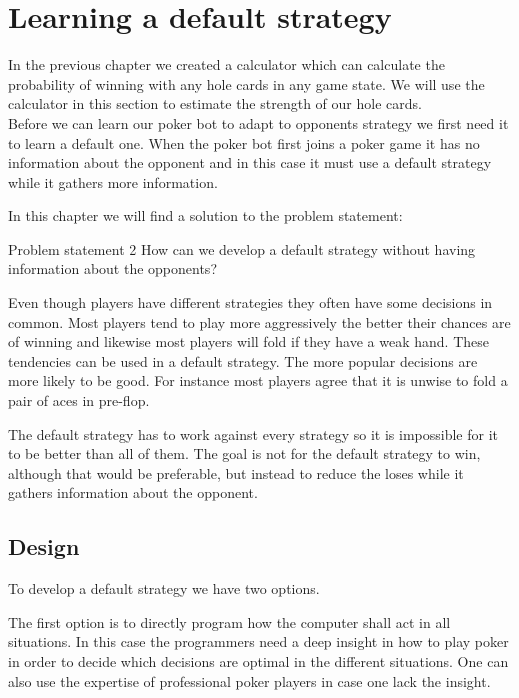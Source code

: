 \section{Learning a default strategy}
\label{sec:part2}
In the previous chapter we created a calculator which can calculate the probability of winning with any hole cards in any game state. We will use the calculator in this section to estimate the strength of our hole cards.\\

Before we can learn our poker bot to adapt to opponents strategy we first need it to learn a default one. When the poker bot first joins a poker game it has no information about the opponent and in this case it must use a default strategy while it gathers more information.

In this chapter we will find a solution to the problem statement:

\vspace{4mm}
\begin{statementBox2}{Problem statement 2}
How can we develop a default strategy without having information about the opponents?
\end{statementBox2}
\vspace{4mm}

Even though players have different strategies they often have some decisions in common. Most players tend to play more aggressively the better their chances are of winning and likewise most players will fold if they have a weak hand. These tendencies can be used in a default strategy. The more popular decisions are more likely to be good. For instance most players agree that it is unwise to fold a pair of aces in pre-flop. 

The default strategy has to work against every strategy so it is impossible for it to be better than all of them. The goal is not for the default strategy to win, although that would be preferable, but instead to reduce the loses while it gathers information about the opponent.

\subsection{Design}
To develop a default strategy we have two options.

The first option is to directly program how the computer shall act in all situations. In this case the programmers need a deep insight in how to play poker in order to decide which decisions are optimal in the different situations. One can also use the expertise of professional poker players in case one lack the insight.

